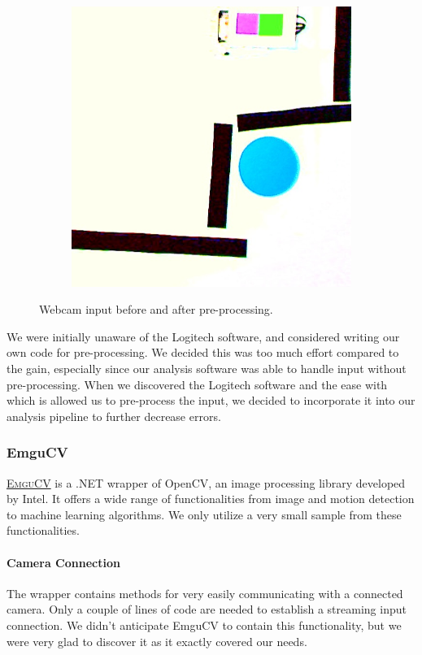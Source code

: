 \documentclass[10pt,twocolumn]{scrartcl}
\newcommand{\link}[2]{\textsc{\href{#1}{#2}}}
\begin{document}
\begin{figure}
\begin{subfigure}[t]{0.45\columnwidth}
	\includegraphics[width=\columnwidth]{pictures/preprocessing2.png}
	\end{subfigure}
	\caption{Webcam input before and after pre-processing.}
	\label{fig:preprocessing}
\end{figure}

We were initially unaware of the Logitech software, and considered writing our own code for pre-processing. We decided this was too much effort compared to the gain, especially since our analysis software was able to handle input without pre-processing. When we discovered the Logitech software and the ease with which is allowed us to pre-process the input, we decided to incorporate it into our analysis pipeline to further decrease errors.

\subsubsection{EmguCV}
\link{http://www.emgu.com/wiki/index.php/Main_Page}{EmguCV} is a .NET wrapper of OpenCV, an image processing library developed by Intel. It offers a wide range of functionalities from image and motion detection to machine learning algorithms. We only utilize a very small sample from these functionalities.

\paragraph{Camera Connection}
The wrapper contains methods for very easily communicating with a connected camera. Only a couple of lines of code are needed to establish a streaming input connection. We didn't anticipate EmguCV to contain this functionality, but we were very glad to discover it as it exactly covered our needs.
\end{document}
